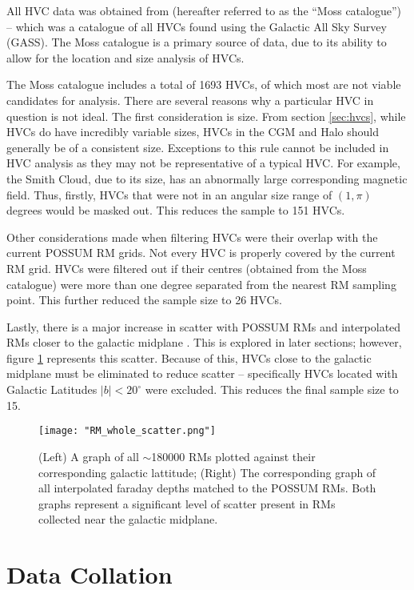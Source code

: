 All HVC data was obtained from \cite{ID3} (hereafter referred to as the “Moss catalogue”) – which was a catalogue of all HVCs found using the Galactic All Sky Survey (GASS). The Moss catalogue is a primary source of data, due to its ability to allow for the location and size analysis of HVCs.


The Moss catalogue includes a total of 1693 HVCs, of which most are not viable candidates for analysis. There are several reasons why a particular HVC in question is not ideal. The first consideration is size. From section \ref{sec:hvcs}, while HVCs do have incredibly variable sizes, HVCs in the CGM and Halo should generally be of a consistent size. Exceptions to this rule cannot be included in HVC analysis as they may not be representative of a typical HVC. For example, the Smith Cloud, due to its size, has an abnormally large corresponding magnetic field. Thus, firstly, HVCs that were not in an angular size range of $(1,\pi)$ degrees would be masked out. This reduces the sample to 151 HVCs.


Other considerations made when filtering HVCs were their overlap with the current POSSUM RM grids. Not every HVC is properly covered by the current RM grid. HVCs were filtered out if their centres (obtained from the Moss catalogue) were more than one degree separated from the nearest RM sampling point. This further reduced the sample size to 26 HVCs.


Lastly, there is a major increase in scatter with POSSUM RMs and interpolated RMs closer to the galactic midplane \citep{ID21}. This is explored in later sections; however, figure \ref{fig:rm_scatter} represents this scatter. Because of this, HVCs close to the galactic midplane must be eliminated to reduce scatter – specifically HVCs located with Galactic Latitudes $|b|<20^{\circ}$ were excluded. This reduces the final sample size to 15.

\begin{figure}
    \texttt{[image: "RM\_whole\_scatter.png"]}
    \centering
    \caption{(Left) A graph of all $\sim$180000 RMs plotted against their corresponding galactic lattitude; (Right) The corresponding graph of all interpolated faraday depths matched to the POSSUM RMs. Both graphs represent a significant level of scatter present in RMs collected near the galactic midplane.}
    \label{fig:rm_scatter}
\end{figure}

\section{Data Collation}
\label{sec:collation}

